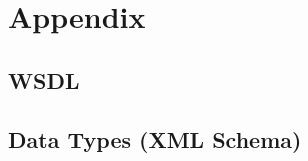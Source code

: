\documentclass[a4paper,11pt]{article}
\begin{document}
	\section{Appendix}
	\label{sec:appendix}		
    
			\subsection{WSDL}

    	

			\subsection{Data Types (XML Schema)}

    	

	\sectionfin
	
	

	\label{lastpage}
\end{document}
